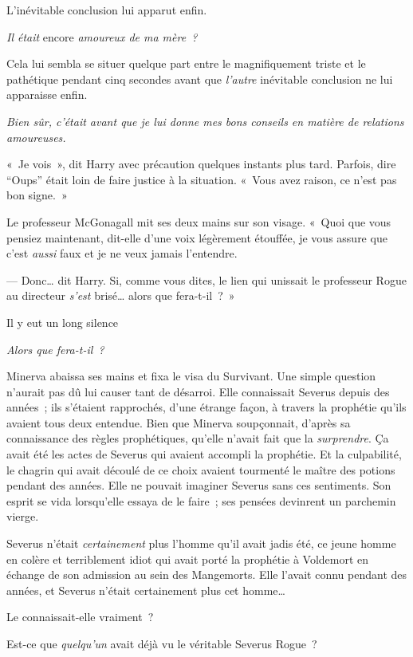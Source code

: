 L'inévitable conclusion lui apparut enfin.

\emph{Il était} encore \emph{amoureux de ma mère~?}

Cela lui sembla se situer quelque part entre le magnifiquement triste et le pathétique pendant cinq secondes avant que \emph{l'autre} inévitable conclusion ne lui apparaisse enfin.

\emph{Bien sûr, c'était avant que je lui donne mes bons conseils en matière de relations amoureuses.}

«~Je vois~», dit Harry avec précaution quelques instants plus tard.
Parfois, dire “Oups” était loin de faire justice à la situation.
«~Vous avez raison, ce n'est pas bon signe.~»

Le professeur McGonagall mit ses deux mains sur son visage.
«~Quoi que vous pensiez maintenant, dit-elle d'une voix légèrement étouffée, je vous assure que c'est \emph{aussi} faux et je ne veux jamais l'entendre.

--- Donc… dit Harry.
Si, comme vous dites, le lien qui unissait le professeur Rogue au directeur \emph{s'est} brisé… alors que fera-t-il~?~»

Il y eut un long silence

\later

\emph{Alors que fera-t-il~?}

Minerva abaissa ses mains et fixa le visa du Survivant.
Une simple question n'aurait pas dû lui causer tant de désarroi.
Elle connaissait Severus depuis des années~; ils s'étaient rapprochés, d'une étrange façon, à travers la prophétie qu'ils avaient tous deux entendue.
Bien que Minerva soupçonnait, d'après sa connaissance des règles prophétiques, qu'elle n'avait fait que la \emph{surprendre}.
Ça avait été les actes de Severus qui avaient accompli la prophétie.
Et la culpabilité, le chagrin qui avait découlé de ce choix avaient tourmenté le maître des potions pendant des années.
Elle ne pouvait imaginer Severus sans ces sentiments.
Son esprit se vida lorsqu'elle essaya de le faire~; ses pensées devinrent un parchemin vierge.

Severus n'était \emph{certainement} plus l'homme qu'il avait jadis été, ce jeune homme en colère et terriblement idiot qui avait porté la prophétie à Voldemort en échange de son admission au sein des Mangemorts.
Elle l'avait connu pendant des années, et Severus n'était certainement plus cet homme…

Le connaissait-elle vraiment~?

Est-ce que \emph{quelqu'un} avait déjà vu le véritable Severus Rogue~?

